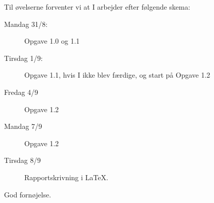 \documentclass[a4paper,12pt]{article}
\begin{document}
Til øvelserne forventer vi at I arbejder efter følgende skema:
\begin{description}
\item[Mandag 31/8:] Opgave 1.0 og 1.1
\item[Tirsdag 1/9:] Opgave 1.1, hvis I ikke blev færdige, og start på
  Opgave 1.2
\item[Fredag 4/9]  Opgave 1.2
\item[Mandag 7/9] Opgave 1.2
\item[Tirsdag 8/9] Rapportskrivning i LaTeX.
\end{description}

\flushright God fornøjelse.
\end{document}
